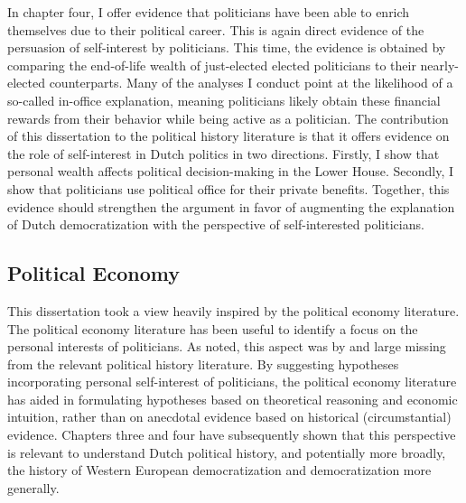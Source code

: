 In chapter four, I offer evidence that politicians have been able to enrich themselves due to their political career. This is again direct evidence of the persuasion of self-interest by politicians. This time, the evidence is obtained by comparing the end-of-life wealth of just-elected elected politicians to their nearly-elected counterparts. Many of the analyses I conduct point at the likelihood of a so-called in-office explanation, meaning politicians likely obtain these financial rewards from their behavior while being active as a politician. The contribution of this dissertation to the political history literature is that it offers evidence on the role of self-interest in Dutch politics in two directions. Firstly, I show that personal wealth affects political decision-making in the Lower House. Secondly, I show that politicians use political office for their private benefits. Together, this evidence should strengthen the argument in favor of augmenting the explanation of Dutch democratization with the perspective of self-interested politicians. 


\subsection{Political Economy}

This dissertation took a view heavily inspired by the political economy literature. The political economy literature has been useful to identify a focus on the personal interests of politicians. As noted, this aspect was by and large missing from the relevant political history literature. By suggesting hypotheses incorporating personal self-interest of politicians, the political economy literature has aided in formulating hypotheses based on theoretical reasoning and economic intuition, rather than on anecdotal evidence based on historical (circumstantial) evidence. Chapters three and four have subsequently shown that this perspective is relevant to understand Dutch political history, and potentially more broadly, the history of Western European democratization and democratization more generally. 


